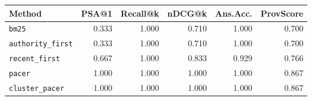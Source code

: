 \begin{tabular}{lrrrrr}
\hline
Method & PSA@1 & Recall@k & nDCG@k & Ans.Acc. & ProvScore \\
\hline
\texttt{bm25} & 0.333 & 1.000 & 0.710 & 1.000 & 0.700 \\
\texttt{authority\_first} & 0.333 & 1.000 & 0.710 & 1.000 & 0.700 \\
\texttt{recent\_first} & 0.667 & 1.000 & 0.833 & 0.929 & 0.766 \\
\texttt{pacer} & 1.000 & 1.000 & 1.000 & 1.000 & 0.867 \\
\texttt{cluster\_pacer} & 1.000 & 1.000 & 1.000 & 1.000 & 0.867 \\
\hline
\end{tabular}


